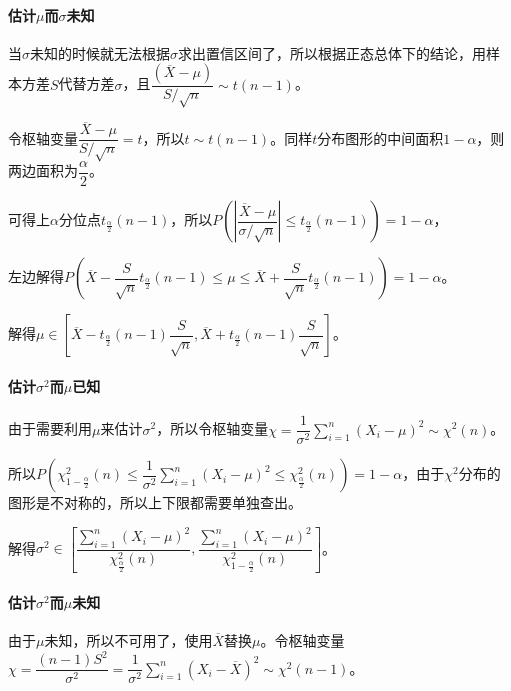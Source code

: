 \documentclass[UTF8, 12pt]{ctexart}
\begin{document}
\paragraph{\texorpdfstring{估计$\mu$而$\sigma$未知}{}} \leavevmode \medskip

当$\sigma$未知的时候就无法根据$\sigma$求出置信区间了，所以根据正态总体下的结论，用样本方差$S$代替方差$\sigma$，且$\dfrac{(\overline{X}-\mu)}{S/\sqrt{n}}\sim t(n-1)$。

令枢轴变量$\dfrac{\overline{X}-\mu}{S/\sqrt{n}}=t$，所以$t\sim t(n-1)$。同样$t$分布图形的中间面积$1-\alpha$，则两边面积为$\dfrac{\alpha}{2}$。

可得上$\alpha$分位点$t_\frac{\alpha}{2}(n-1)$，所以$P\left(\left\vert\dfrac{\overline{X}-\mu}{\sigma/\sqrt{n}}\right\vert\leqslant t_\frac{\alpha}{2}(n-1)\right)=1-\alpha$，

左边解得$P\left(\overline{X}-\dfrac{S}{\sqrt{n}}t_\frac{\alpha}{2}(n-1)\leqslant\mu\leqslant\overline{X}+\dfrac{S}{\sqrt{n}}t_\frac{\alpha}{2}(n-1)\right)=1-\alpha$。

解得$\mu\in[\overline{X}-t_\frac{\alpha}{2}(n-1)\dfrac{S}{\sqrt{n}},\overline{X}+t_\frac{\alpha}{2}(n-1)\dfrac{S}{\sqrt{n}}]$。

\paragraph{\texorpdfstring{估计$\sigma^2$而$\mu$已知}{}} \leavevmode \medskip

由于需要利用$\mu$来估计$\sigma^2$，所以令枢轴变量$\chi=\dfrac{1}{\sigma^2}\sum\limits_{i=1}^n(X_i-\mu)^2\sim\chi^2(n)$。

所以$P\left(\chi^2_{1-\frac{\alpha}{2}}(n)\leqslant\dfrac{1}{\sigma^2}\sum\limits_{i=1}^n(X_i-\mu)^2\leqslant\chi^2_\frac{\alpha}{2}(n)\right)=1-\alpha$，由于$\chi^2$分布的图形是不对称的，所以上下限都需要单独查出。

解得$\sigma^2\in\left[\dfrac{\sum\limits_{i=1}^n(X_i-\mu)^2}{\chi^2_\frac{\alpha}{2}(n)},\dfrac{\sum\limits_{i=1}^n(X_i-\mu)^2}{\chi^2_{1-\frac{\alpha}{2}}(n)}\right]$。

\paragraph{\texorpdfstring{估计$\sigma^2$而$\mu$未知}{}} \leavevmode \medskip

由于$\mu$未知，所以不可用了，使用$\overline{X}$替换$\mu$。令枢轴变量$\chi=\dfrac{(n-1)S^2}{\sigma^2}=\dfrac{1}{\sigma^2}\sum\limits_{i=1}^n(X_i-\overline{X})^2\sim\chi^2(n-1)$。
\end{document}

